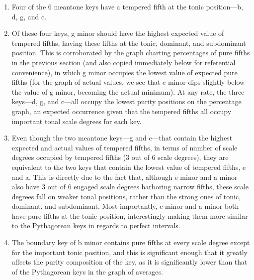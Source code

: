 \begin{enumerate}
\def\labelenumi{\arabic{enumi}.}
\tightlist
\item
  Four of the 6 meantone keys have a tempered fifth at the tonic
  position---b, d, g, and c.
\item
  Of these four keys, g minor should have the highest expected value of
  tempered fifths, having these fifths at the tonic, dominant, and
  subdominant position. This is corroborated by the graph charting
  percentages of pure fifths in the previous section (and also copied
  immediately below for referential convenience), in which g minor
  occupies the lowest value of expected pure fifths (for the graph of
  actual values, we see that c minor dips slightly below the value of g
  minor, becoming the actual minimum). At any rate, the three
  keys---d, g, and c---all occupy the lowest purity positions on
  the percentage graph, an expected occurrence given that the tempered
  fifths all occupy important tonal scale degrees for each key.
\item
  Even though the two meantone keys---g and c---that contain the
  highest expected and actual values of tempered fifths, in terms of
  number of scale degrees occupied by tempered fifths (3 out of 6 scale
  degrees), they are equivalent to the two keys that contain the lowest
  value of tempered fifths, e and a. This is directly due to the fact
  that, although e minor and a minor also have 3 out of 6 engaged scale
  degrees harboring narrow fifths, these scale degrees fall on weaker
  tonal positions, rather than the strong ones of tonic, dominant, and
  subdominant. Most importantly, e minor and a minor both have pure
  fifths at the tonic position, interestingly making them more similar
  to the Pythagorean keys in regards to perfect intervals.
\item
  The boundary key of b minor contains pure fifths at every scale degree
  except for the important tonic position, and this is significant
  enough that it greatly affects the purity composition of the key, as
  it is significantly lower than that of the Pythagorean keys in the
  graph of averages.
\end{enumerate}



